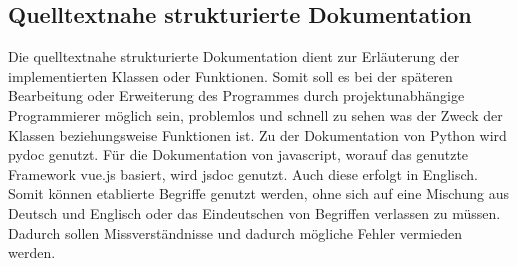\subsection{Quelltextnahe strukturierte Dokumentation}
Die quelltextnahe strukturierte Dokumentation dient zur Erläuterung der implementierten Klassen oder Funktionen. Somit soll es bei der späteren Bearbeitung oder Erweiterung des Programmes durch projektunabhängige Programmierer möglich sein, problemlos und schnell zu sehen was der Zweck der Klassen beziehungsweise Funktionen ist. Zu der Dokumentation von Python wird pydoc genutzt. Für die Dokumentation von javascript, worauf das genutzte Framework vue.js basiert, wird jsdoc genutzt. Auch diese erfolgt in Englisch. Somit können etablierte Begriffe genutzt werden, ohne sich auf eine Mischung aus Deutsch und Englisch oder das Eindeutschen von Begriffen verlassen zu müssen. Dadurch sollen Missverständnisse und dadurch mögliche Fehler vermieden werden.
